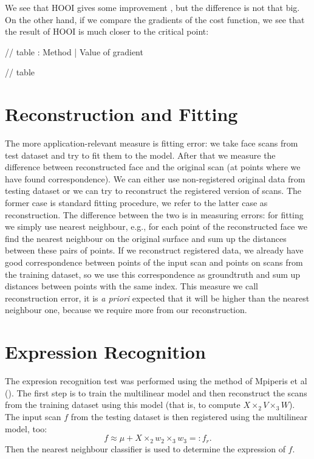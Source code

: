 We see that HOOI gives some improvement 
, but the difference is not that big. On the other hand, if we compare the 
gradients of the cost function, we see that the result of HOOI is much closer to the 
critical point:

// table : Method | Value of gradient


// table 

\section{Reconstruction and Fitting}
The more application-relevant measure is fitting error: we take face scans
from test dataset and try to fit them to the model. After that we measure the difference
between reconstructed face and the original scan (at points where we have found correspondence).
We can either use non-registered original data from testing dataset
or we can try to reconstruct the registered version of scans. The former case is 
standard fitting procedure, we refer to the latter case as reconstruction. The difference
between the two is in measuring errors: for fitting we simply use nearest neighbour,
e.g., for each point of the reconstructed face we find the nearest neighbour on the
original surface and sum up the distances between these pairs of points.
If we reconstruct registered data, we already have good correspondence
between points of the input scan and points on scans from the training dataset,
so we use this correspondence as groundtruth and sum up distances between 
points with the same index. This measure we call reconstruction error,
it is \textit{a priori} expected that it will be higher than the nearest neighbour
one, because we require more from our reconstruction.



\section{Expression Recognition}

The expresion recognition test was performed using the method of Mpiperis et al (\cite{?}).
The first step is to train the multilinear model and then reconstruct
the scans from the training dataset using this model (that is, to compute 
$X \times_2 V \times_3 W$).  The input scan $f$ from the testing dataset
is then registered using the multilinear model, too:
\begin{equation}
    f \approx \mu + X \times_2 w_2 \times_3 w_3 =: f_r.
\end{equation}
Then the nearest neighbour classifier is used to determine the expression
of $f$.

